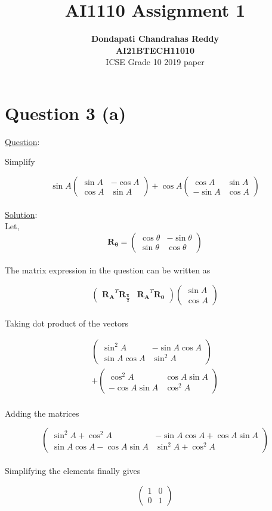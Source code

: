 \documentclass[journal,12pt,twocolumn]{IEEEtran}
\newcommand{\myvec}[1]{\ensuremath{\begin{pmatrix}#1\end{pmatrix}}}
\let\vec\mathbf
\begin{document}
\title{\textbf{AI1110 Assignment 1} }
\author{\textbf{Dondapati Chandrahas Reddy}\\ \textbf{AI21BTECH11010}\\ ICSE Grade 10 2019 paper}

\maketitle

{\section {Question 3 (a) \newline}}

{\large \underline{Question}:\newline}

Simplify

\begin{equation}
	\sin A\myvec{\sin A &  -\cos A \\ \cos A & \sin A} + \cos A \myvec{\cos A &  \sin A \\ -\sin A & \cos A}
\end{equation}\\

{\large \underline{Solution}:}\\

Let,
\begin{equation}
	\vec{R_\theta} = \myvec{\cos \theta &  -\sin \theta \\ \sin \theta & \cos \theta}
\end{equation}\\

The matrix expression in the question can be written as

\begin{equation}
	\myvec{\vec{R_A}^T \vec{R_{\frac{\pi}{2}}} & \vec{R_A}^T \vec{R_0}} \myvec{\sin A \\ \cos A}
\end{equation}\\

Taking dot product of the vectors

\begin{multline}
	\myvec{\sin^2 A &  -\sin A\cos A \\ \sin A\cos A & \sin^2 A} \\ 
	+ \myvec{\cos^2 A & \cos A\sin A \\ -\cos A\sin A & \cos^2 A}
\end{multline}\\

Adding the matrices

\begin{equation}
	\myvec{\sin^2 A + \cos^2 A &  -\sin A \cos A +\cos A \sin A \\ \sin A \cos A -\cos A \sin A & \sin^2 A + \cos^2 A}
\end{equation}\\

Simplifying the elements finally gives

\begin{equation}
	\myvec{1 & 0 \\ 0 & 1}
\end{equation}\\
\end{document}
